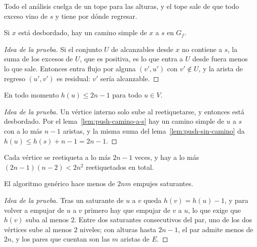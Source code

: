 \documentclass[11pt,letterpaper]{article}
\begin{document}
Todo el análisis cuelga de un tope para las alturas, y el tope sale de
que todo exceso vino de $s$ y tiene por dónde regresar.

\begin{lema}
  \label{lem:push-camino-a-s}
  Si $x$ está desbordado, hay un camino simple de $x$ a $s$ en $G_f$.
\end{lema}

\begin{proof}[Idea de la prueba]
  Si el conjunto $U$ de alcanzables desde $x$ no contiene a $s$, la
  suma de los excesos de $U$, que es positiva, es lo que entra a $U$
  desde fuera menos lo que sale. Entonces entra flujo por alguna
  $(v', u')$ con $v' \notin U$, y la arista de regreso $(u', v')$ es
  residual: $v'$ sería alcanzable.
\end{proof}

\begin{lema}
  \label{lem:push-tope-alturas}
  En todo momento $h(u) \le 2n - 1$ para todo $u \in V$.
\end{lema}

\begin{proof}[Idea de la prueba]
  Un vértice interno solo sube al reetiquetarse, y entonces está
  desbordado. Por el lema~\ref{lem:push-camino-a-s} hay un camino
  simple de $u$ a $s$ con a lo más $n - 1$ aristas, y la misma suma
  del lema~\ref{lem:push-sin-camino} da
  $h(u) \le h(s) + n - 1 = 2n - 1$.
\end{proof}

\begin{corolario}
  \label{cor:push-reetiquetados}
  Cada vértice se reetiqueta a lo más $2n - 1$ veces, y hay a lo más
  $(2n - 1)(n - 2) < 2n^2$ reetiquetados en total.
\end{corolario}

\begin{lema}
  \label{lem:push-saturantes}
  El algoritmo genérico hace menos de $2nm$ empujes saturantes.
\end{lema}

\begin{proof}[Idea de la prueba]
  Tras un saturante de $u$ a $v$ queda $h(v) = h(u) - 1$, y para
  volver a empujar de $u$ a $v$ primero hay que empujar de $v$ a $u$,
  lo que exige que $h(v)$ suba al menos $2$. Entre dos saturantes
  consecutivos del par, uno de los dos vértices sube al menos $2$
  niveles; con alturas hasta $2n - 1$, el par admite menos de $2n$, y
  los pares que cuentan son las $m$ aristas de $E$.
\end{proof}
\end{document}
